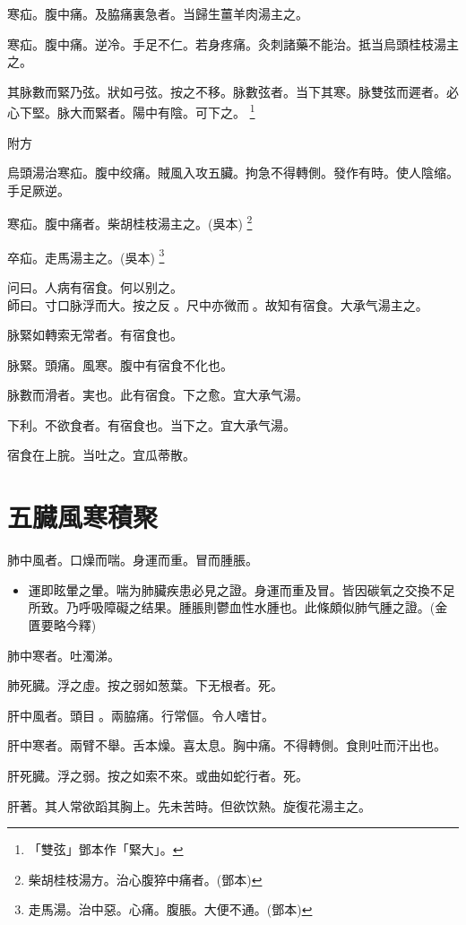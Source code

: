 \documentclass[oneside,b4paper]{ctexbook}
\begin{document}
\begin{flushleft}
寒疝。腹中痛。及脇痛裏急者。当歸生薑羊肉湯主之。

寒疝。腹中痛。逆冷。手足不仁。若身疼痛。灸刺諸藥不能治。抵当烏頭桂枝湯主之。

其脉數而緊乃弦。狀如弓弦。按之不移。脉數弦者。当下其寒。脉雙弦而遲者。必心下堅。脉大而緊者。陽中有陰。可下之。
\footnote{「雙弦」鄧本作「緊大」。}

附方

烏頭湯治寒疝。腹中绞痛。賊風入攻五臟。拘急不得轉側。發作有時。使人陰缩。手足厥逆。

寒疝。腹中痛者。柴胡桂枝湯主之。(吳本)
\footnote{柴胡桂枝湯方。治心腹猝中痛者。(鄧本)}

卒疝。走馬湯主之。(吳本)
\footnote{走馬湯。治中惡。心痛。腹脹。大便不通。(鄧本)}

问曰。人病有宿食。何以别之。\\
師曰。寸口脉浮而大。按之反{𬈧}。尺中亦微而{𬈧}。故知有宿食。大承气湯主之。

脉緊如轉索无常者。有宿食也。

脉緊。頭痛。風寒。腹中有宿食不化也。

脉數而滑者。実也。此有宿食。下之愈。宜大承气湯。

下利。不欲食者。有宿食也。当下之。宜大承气湯。

宿食在上脘。当吐之。宜瓜蒂散。

\chapter{五臓風寒積聚}

肺中風者。口燥而喘。身運而重。冒而腫脹。

\begin{itemize}
\item 運即眩暈之暈。喘为肺臟疾患必見之證。身運而重及冒。皆因碳氧之交換不足所致。乃呼吸障礙之结果。腫脹則鬱血性水腫也。此條頗似肺气腫之證。(金匱要略今釋)
\end{itemize}

肺中寒者。吐濁涕。

肺死臓。浮之虛。按之弱如葱葉。下无根者。死。

肝中風者。頭目{𥆧}。兩脇痛。行常傴。令人嗜甘。

肝中寒者。兩臂不舉。舌本燥。喜太息。胸中痛。不得轉側。食則吐而汗出也。

肝死臓。浮之弱。按之如索不來。或曲如蛇行者。死。

肝著。其人常欲蹈其胸上。先未苦時。但欲饮熱。旋復花湯主之。


\end{flushleft}
\end{document}
